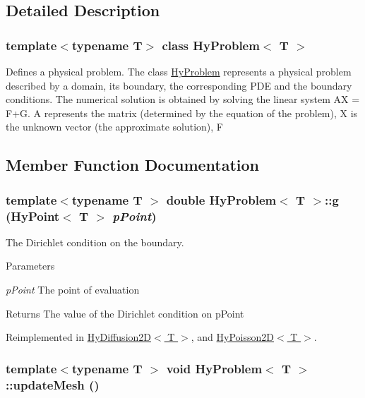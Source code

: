 \subsection{Detailed Description}
\subsubsection*{template$<$typename T$>$ class HyProblem$<$ T $>$}

Defines a physical problem. The class \hyperlink{classHyProblem}{HyProblem} represents a physical problem described by a domain, its boundary, the corresponding PDE and the boundary conditions. The numerical solution is obtained by solving the linear system AX = F+G. A represents the matrix (determined by the equation of the problem), X is the unknown vector (the approximate solution), F 

\subsection{Member Function Documentation}
\hypertarget{classHyProblem_a5d3b78c69811136e74e9fc9232cc110b}{
\subsubsection[{g}]{\setlength{\rightskip}{0pt plus 5cm}template$<$typename T $>$ double {\bf HyProblem}$<$ T $>$::g ({\bf HyPoint}$<$ T $>$ {\em pPoint})}}
\label{classHyProblem_a5d3b78c69811136e74e9fc9232cc110b}


The Dirichlet condition on the boundary. 


\begin{DoxyParams}{Parameters}
\item[{\em pPoint}]The point of evaluation \end{DoxyParams}
\begin{DoxyReturn}{Returns}
The value of the Dirichlet condition on pPoint 
\end{DoxyReturn}


Reimplemented in \hyperlink{classHyDiffusion2D_a0df1a7fbe0b6a50d85a74c655f32cfb2}{HyDiffusion2D$<$ T $>$}, and \hyperlink{classHyPoisson2D_a9c27e90e3abb3a6ebe5d6b3274412e7a}{HyPoisson2D$<$ T $>$}.

\hypertarget{classHyProblem_a894b6467b03798221e48e1fb10ad3fcf}{
\subsubsection[{updateMesh}]{\setlength{\rightskip}{0pt plus 5cm}template$<$typename T $>$ void {\bf HyProblem}$<$ T $>$::updateMesh ()}}
\label{classHyProblem_a894b6467b03798221e48e1fb10ad3fcf}


